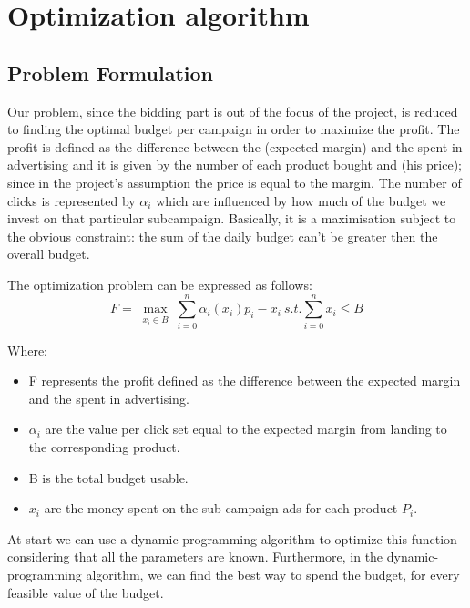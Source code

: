 \chapter{Optimization algorithm}
\label{chap:opt_alg}

\section{Problem Formulation}
\label{sec:Opt_Problem Formulation}
Our problem, since the bidding part is out of the focus of the project, is reduced to finding the optimal budget per campaign in order to maximize the profit.
The profit is defined as the difference between the (expected margin) and the spent in advertising and it is given by the number of each product bought and (his price); since in the project's assumption the price is equal to the margin.
The number of clicks is represented by $\alpha_i$ which are influenced by how much of the budget we invest on that particular subcampaign.
Basically, it is a maximisation subject to the obvious constraint: the sum of the daily budget can't be greater then the overall budget.


The optimization problem can be expressed as follows:
\begin{displaymath}
F=\max_{\substack{x_i\in B}} \sum_{i=0}^n \alpha_i(x_i)p_i-x_i \ s.t. \sum_{i=0}^n x_i\leq B  
\end{displaymath}

Where: 
\begin{itemize}
    \item F represents the profit defined as the difference between the expected margin and the spent in advertising.
    \item $\alpha_i$ are the value per click set equal to the expected margin from landing to the corresponding product.
    \item B is the total budget usable.
    \item $x_i$ are the money spent on the sub campaign ads for each product $P_i$.
\end{itemize}

At start we can use a dynamic-programming algorithm to optimize this function considering that all the parameters are known.
 Furthermore, in the dynamic-programming algorithm, we can find the best way to spend the budget, for every feasible value of the budget. 

